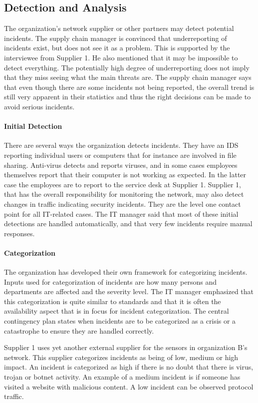 \subsection{Detection and Analysis}
The organization's network supplier or other partners may detect potential incidents. The supply chain manager is convinced that underreporting of incidents exist, but does not see it as a problem. This is supported by the interviewee from Supplier 1. He also mentioned that it may be impossible to detect everything. The potentially high degree of underreporting does not imply that they miss seeing what the main threats are. The supply chain manager says that even though there are some incidents not being reported, the overall trend is still very apparent in their statistics and thus the right decisions can be made to avoid serious incidents. 

\paragraph{Initial Detection}
There are several ways the organization detects incidents. They have an \ac{IDS} reporting individual users or computers that for instance are involved in file sharing. Anti-virus detects and reports viruses, and in some cases employees themselves report that their computer is not working as expected. In the latter case the employees are to report to the service desk at Supplier 1. Supplier 1, that has the overall responsibility for monitoring the network, may also detect changes in traffic indicating security incidents. They are the level one contact point for all IT-related cases. The IT manager said that most of these initial detections are handled automatically, and that very few incidents require manual responses. 

\paragraph{Categorization}
The organization has developed their own framework for categorizing incidents. Inputs used for categorization of incidents are how many persons and departments are affected and the severity level. The IT manager emphasized that this categorization is quite similar to standards and that it is often the availability aspect that is in focus for incident categorization. The central contingency plan states when incidents are to be categorized as a crisis or a catastrophe to ensure they are handled correctly.

Supplier 1 uses yet another external supplier for the sensors in organization B's network. This supplier categorizes incidents as being of low, medium or high impact. An incident is categorized as high if there is no doubt that there is virus, trojan or botnet activity. An example of a medium incident is if someone has visited a website with malicious content. A low incident can be observed protocol traffic.


